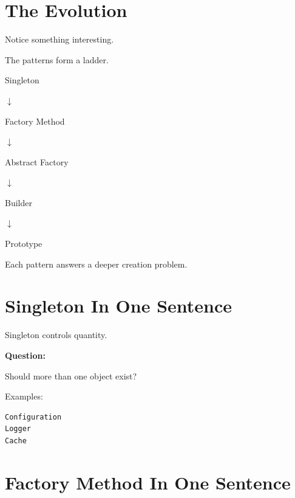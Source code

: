 \documentclass[11pt,a4paper]{book}
\begin{document}

\section{The Evolution}

Notice something interesting.

The patterns form a ladder.

\begin{mentalmodel}

Singleton

$\downarrow$

Factory Method

$\downarrow$

Abstract Factory

$\downarrow$

Builder

$\downarrow$

Prototype

\end{mentalmodel}

Each pattern answers a deeper creation problem.


\section{Singleton In One Sentence}

\begin{idea}

Singleton controls quantity.

\end{idea}

\textbf{Question:}

\begin{center}
Should more than one object exist?
\end{center}

Examples:

\begin{verbatim}
Configuration
Logger
Cache
\end{verbatim}


\section{Factory Method In One Sentence}
\end{document}
